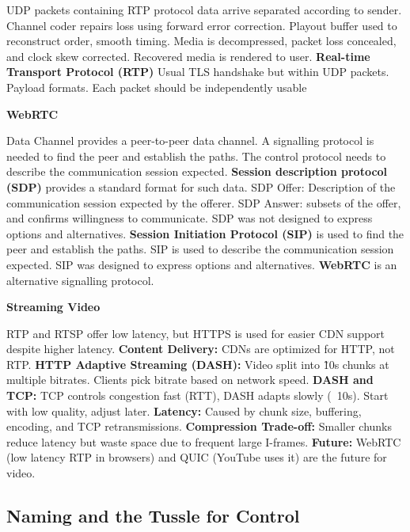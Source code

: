 \documentclass{article}
\begin{document}
UDP packets containing RTP protocol data arrive separated according to sender.
Channel coder repairs loss using forward error correction.
Playout buffer used to reconstruct order, smooth timing.
Media is decompressed, packet loss concealed, and clock skew corrected.
Recovered media is rendered to user.
\textbf{Real-time Transport Protocol (RTP)}
Usual TLS handshake but within UDP packets.
Payload formats.
Each packet should be independently usable

\vspace{\baselineskip}
\textbf{WebRTC}

Data Channel provides a peer-to-peer data channel.
A signalling protocol is needed to find the peer and establish the paths.
The control protocol needs to describe the communication session expected.
\textbf{Session description protocol (SDP)} provides a standard format for such data.
SDP Offer: Description of the communication session expected by the offerer.
SDP Answer: subsets of the offer, and confirms willingness to communicate.
SDP was not designed to express options and alternatives.
\textbf{Session Initiation Protocol (SIP)} is used to find the peer and establish the paths.
SIP is used to describe the communication session expected.
SIP was designed to express options and alternatives.
\textbf{WebRTC} is an alternative signalling protocol.

\vspace{\baselineskip}
\textbf{Streaming Video}

RTP and RTSP offer low latency, but HTTPS is used for easier CDN support despite higher latency.
\textbf{Content Delivery:}
CDNs are optimized for HTTP, not RTP\@.
\textbf{HTTP Adaptive Streaming (DASH):}
Video split into \~10s chunks at multiple bitrates. Clients pick bitrate based on network speed.
\textbf{DASH and TCP:}
TCP controls congestion fast (RTT), DASH adapts slowly (~10s). Start with low quality, adjust later.
\textbf{Latency:}
Caused by chunk size, buffering, encoding, and TCP retransmissions.
\textbf{Compression Trade-off:}
Smaller chunks reduce latency but waste space due to frequent large I-frames.
\textbf{Future:}
WebRTC (low latency RTP in browsers) and QUIC (YouTube uses it) are the future for video.

\clearpage

\subsection*{Naming and the Tussle for Control}
\end{document}
